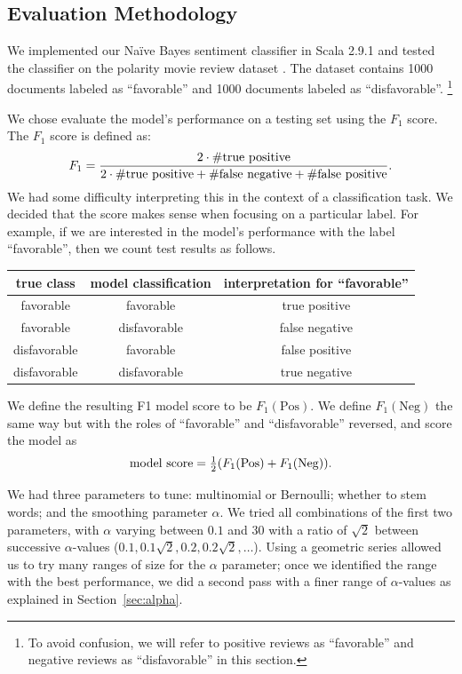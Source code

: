 \documentclass{article}
\newcommand{\PosC}{\mathrm{Pos}}
\newcommand{\NegC}{\mathrm{Neg}}
\begin{document}
\subsection{Evaluation Methodology}

We implemented our Na\"{i}ve Bayes sentiment classifier in Scala 2.9.1 and tested the classifier on the polarity movie review dataset \cite{polarity-dataset, Pang+Lee:04a}. The dataset contains 1000 documents labeled as ``favorable'' and 1000 documents labeled as ``disfavorable''.
\footnote{To avoid confusion, we will refer to positive reviews as ``favorable'' and negative reviews as ``disfavorable'' in this section.}

We chose evaluate the model's performance on a testing set using the \(F_1\) score.  The \(F_1\) score is defined as:
\[
  F_1=
  \frac
      {2\cdot\#\text{true positive}}
      {2\cdot\#\text{true positive}+\#\text{false negative}+\#\text{false positive}}
  \ldotp
\]
We had some difficulty interpreting this in the context of a classification task.
We decided that the score makes sense when focusing on a particular label.
For example, if we are interested in the model's performance with the label ``favorable'', then we count test results as follows.

\begin{tabular}{c|c|c}
  true class & model classification & interpretation for ``favorable'' \\
  \hline
  favorable & favorable & true positive \\
  favorable & disfavorable & false negative \\
  disfavorable & favorable & false positive \\
  disfavorable & disfavorable & true negative \\
\end{tabular}

We define the resulting F1 model score to be \(F_1(\PosC)\).
We define \(F_1(\NegC)\) the same way but with the roles of ``favorable'' and ``disfavorable'' reversed, and score the model as
\[\text{model score}=\tfrac12 (F_1(\PosC) + F_1(\NegC)) \ldotp\]

We had three parameters to tune: multinomial or Bernoulli; whether to stem words; and the smoothing parameter \(\alpha\).  We tried all combinations of the first two parameters, with \(\alpha\) varying between \(0.1\) and \(30\) with a ratio of \(\sqrt{2}\) between successive \(\alpha\)-values (\(0.1, 0.1\sqrt{2}, 0.2, 0.2\sqrt{2}, \dotsc\)).  Using a geometric series allowed us to try many ranges of size for the \(\alpha\) parameter; once we identified the range with the best performance, we did a second pass with a finer range of \(\alpha\)-values as explained in Section~\ref{sec:alpha}.
\end{document}

